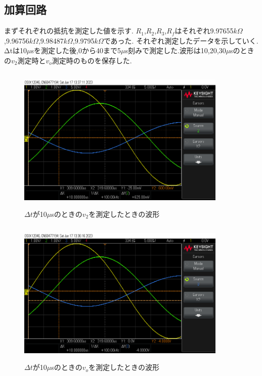 \documentclass[a4j,10pt,dvipdfmx]{jarticle}
\begin{document}
\subsection{加算回路}
まずそれぞれの抵抗を測定した値を示す.
$R_1$,$R_2$,$R_3$,$R_f$はそれぞれ9.97655$k\Omega$,9.96756$k\Omega$,9.98487$k\Omega$,9.9795$k\Omega$であった.
それぞれ測定したデータを示していく.
Δtは10$\mu$sを測定した後,0から40まで5$\mu$s刻みで測定した.波形は10,20,30$\mu$sのときの$v_2$測定時と$v_o$測定時のものを保存した.
\begin{figure}[H]
  \begin{center}
  \includegraphics[height=7cm,width=10cm]{V2.png}
  \caption{$\Delta t$が10$\mu$sのときの$v_2$を測定したときの波形}
\end{center}
\end{figure}
\begin{figure}[H]
  \begin{center}
  \includegraphics[height=7cm,width=10cm]{Vout.png}
  \caption{$\Delta t$が10$\mu$sのときの$v_o$を測定したときの波形}
\end{center}
\end{figure}
\end{document}
